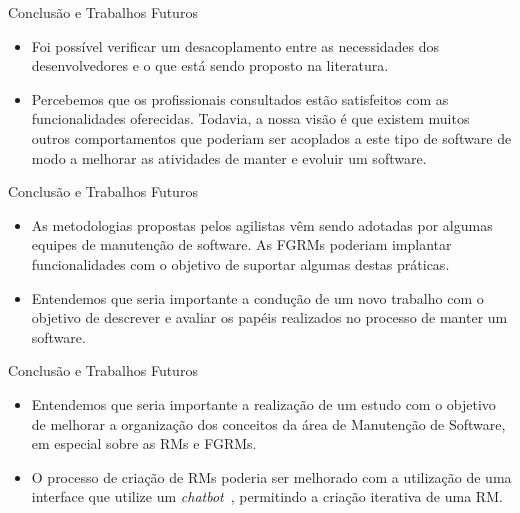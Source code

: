 \documentclass[t,14pt,mathserif]{beamer}
\begin{document}
\begin{frame}{Conclusão e Trabalhos Futuros}
    \begin{itemize}

        \item Foi possível verificar um desacoplamento entre as necessidades
            dos desenvolvedores e o que está sendo proposto na literatura.

        \item Percebemos que os profissionais consultados estão satisfeitos com
            as funcionalidades oferecidas. Todavia, a nossa visão é que existem
            muitos outros comportamentos que poderiam ser acoplados a este tipo
            de software de modo a melhorar as atividades de manter e evoluir um
            software.
    \end{itemize}
\end{frame}
\begin{frame}{Conclusão e Trabalhos Futuros}
    \begin{itemize}

        \item  As metodologias propostas pelos agilistas vêm sendo adotadas por
            algumas equipes de manutenção de software. As FGRMs poderiam
            implantar funcionalidades com o objetivo de suportar algumas destas
            práticas.

        \item Entendemos que seria importante a condução de um novo trabalho com
            o objetivo de descrever e avaliar os papéis realizados no processo
            de manter um software.
    \end{itemize}
\end{frame}

\begin{frame}{Conclusão e Trabalhos Futuros}
    \begin{itemize}

        \item Entendemos que seria importante a realização de um estudo com o
            objetivo de melhorar a organização dos conceitos da área de
            Manutenção de Software, em especial sobre as RMs e FGRMs.

        \item O processo de criação de RMs poderia ser melhorado com a
            utilização de uma interface que utilize um
            \textit{chatbot}~\cite{mauldin1994chatterbots,huang2007extracting},
            permitindo a criação iterativa de uma RM\@.
    \end{itemize}
\end{frame}
\end{document}
